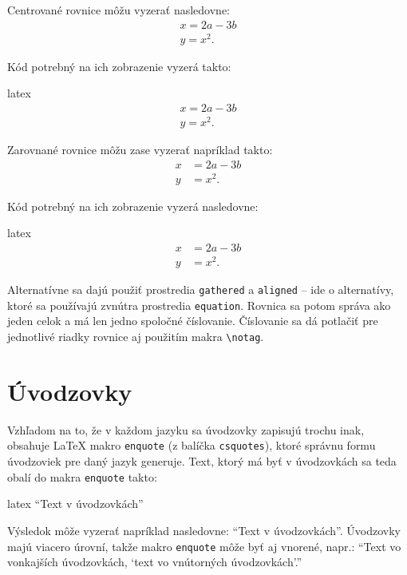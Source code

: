 Centrované rovnice môžu vyzerať nasledovne:
\begin{gather}
x = 2a - 3b \\
y = x^2.
\end{gather}

Kód potrebný na ich zobrazenie vyzerá takto:
\begin{inlinecode}{latex}
\begin{gather}
x = 2a - 3b \\
y = x^2.
\end{gather}
\end{inlinecode}

Zarovnané rovnice môžu zase vyzerať napríklad takto:
\begin{align}
x &= 2a - 3b \\
y &= x^2.
\end{align}

Kód potrebný na ich zobrazenie vyzerá nasledovne:
\begin{inlinecode}{latex}
\begin{align}
x &= 2a - 3b \\
y &= x^2.
\end{align}
\end{inlinecode}

Alternatívne sa dajú použiť prostredia \texttt{gathered} a \texttt{aligned} -- ide o alternatívy, ktoré sa používajú zvnútra prostredia \texttt{equation}. Rovnica sa potom správa ako jeden celok a má len jedno spoločné číslovanie. Číslovanie sa dá potlačiť pre jednotlivé riadky rovnice aj použitím makra \texttt{{\textbackslash}notag}.

\section{Úvodzovky}

Vzhľadom na to, že v každom jazyku sa úvodzovky zapisujú trochu inak, obsahuje LaTeX makro \texttt{enquote} (z balíčka \texttt{csquotes}), ktoré správnu formu úvodzoviek pre daný jazyk generuje. Text, ktorý má byť v úvodzovkách sa teda obalí do makra \texttt{enquote} takto:
\begin{inlinecode}{latex}
\enquote{Text v úvodzovkách}
\end{inlinecode}

Výsledok môže vyzerať napríklad nasledovne: \enquote{Text v úvodzovkách}. Úvodzovky majú viacero úrovní, takže makro \texttt{enquote} môže byť aj vnorené, napr.: \enquote{Text vo vonkajších úvodzovkách, \enquote{text vo vnútorných úvodzovkách}.}

